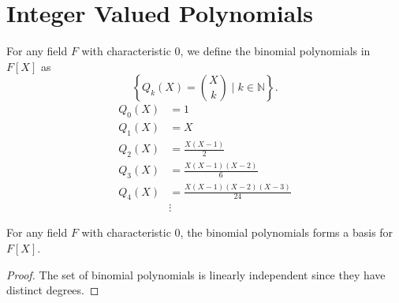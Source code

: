 \section{Integer Valued Polynomials}
\label{sec:integer_valued_polynomial}

\begin{definition}
    \label{def:binomial_polynomial}
    \leanok
    For any field $F$ with characteristic $0$, we define the binomial polynomials in $F[X]$ as
    \[
      \left\{ Q_k(X) = {X \choose k} \mid k \in \mathbb{N} \right\}.
    \]
    \begin{equation}
        \begin{aligned}
            Q_0(X) &= 1 \\
            Q_1(X) &= X \\
            Q_2(X) &= \frac{X(X-1)}{2} \\
            Q_3(X) &= \frac{X(X-1)(X-2)}{6} \\
            Q_4(X) &= \frac{X(X-1)(X-2)(X-3)}{24} \\
            &\vdots
        \end{aligned}
    \end{equation}
\end{definition}

\begin{lemma}
    For any field $F$ with characteristic $0$, the binomial polynomials forms a basis for $F[X]$.
    \leanok
\end{lemma}
\begin{proof}
    The set of binomial polynomials is linearly independent since they have distinct degrees.
\end{proof}

